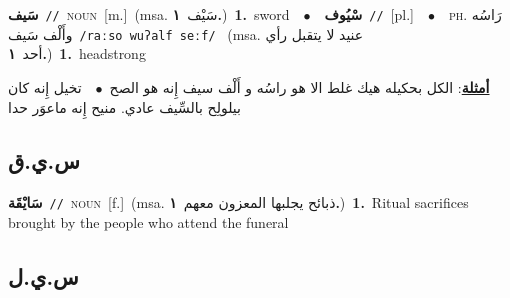 \documentclass[10pt,a4paper,twoside]{article} %
\begin{document}
\begin{multicols}{2}
{\setlength\topsep{0pt}\textbf{\foreignlanguage{arabic}{سَيف}}\ {\color{gray}\texttt{//}\color{black}}\ \textsc{noun}\ [m.]\ \color{gray}(msa. \foreignlanguage{arabic}{سَيْف}~\foreignlanguage{arabic}{\textbf{١.}})\color{black}\ \textbf{1.}~sword\ \ $\bullet$\ \ \setlength\topsep{0pt}\textbf{\foreignlanguage{arabic}{سْيُوف}}\ {\color{gray}\texttt{//}\color{black}}\ [pl.]\ \ $\bullet$\ \ \textsc{ph.} \color{gray} \foreignlanguage{arabic}{رَاسُه وأَلْف سَيف}\color{black}\ {\color{gray}\texttt{/{\sffamily raːso wuʔalf seːf}/}\color{black}}\ \color{gray} (msa. \foreignlanguage{arabic}{عنيد لا يتقبل رأي أحد}~\foreignlanguage{arabic}{\textbf{١.}})\color{black}\ \textbf{1.}~headstrong\  \begin{flushright}\color{gray}\foreignlanguage{arabic}{\textbf{\underline{\foreignlanguage{arabic}{أمثلة}}}: الكل بحكيله هيك غلط الا هو راسُه و أَلْف سيف إِنه هو الصح\ $\bullet$\ \  تخيل إِنه كان بيلولِح بالسِّيف عادي. منيح إِنه ماعوَر حدا}\end{flushright}\color{black}} \vspace{2mm}

\vspace{-3mm}
\subsection*{\color{blue}\foreignlanguage{arabic}{س.ي.ق}\color{blue}{}} 

{\setlength\topsep{0pt}\textbf{\foreignlanguage{arabic}{سَايْقَة}}\ {\color{gray}\texttt{//}\color{black}}\ \textsc{noun}\ [f.]\ \color{gray}(msa. \foreignlanguage{arabic}{ذبائح يجلبها المعزون معهم}~\foreignlanguage{arabic}{\textbf{١.}})\color{black}\ \textbf{1.}~Ritual sacrifices brought by the people who attend the funeral\ } \vspace{2mm}

\vspace{-3mm}
\subsection*{\color{blue}\foreignlanguage{arabic}{س.ي.ل}\color{blue}{}} 


\end{multicols}
\end{document}
